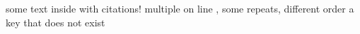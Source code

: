 \documentclass{article}
\begin{document}
some text inside \cite{doi:10.1093/imrn/rnw336} with citations!
multiple on line \cite{zbl:1467.28001}, \cite{arxiv:2209.13952}
some repeats, different order \cite{zbl:1467.28001, zbl:1321.54059}
a key that does not exist \cite{noexist}
\printbibliography
\end{document}
